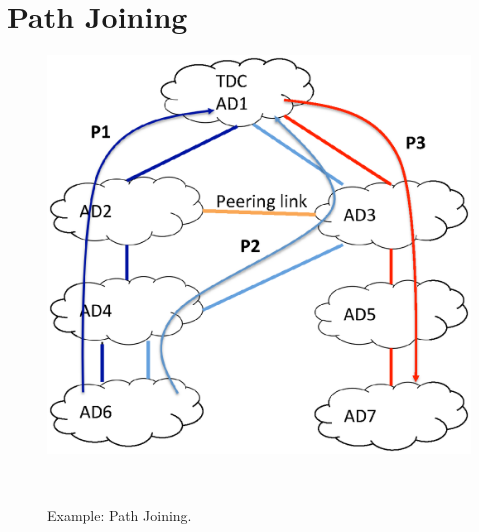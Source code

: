 \section{Path Joining}

\begin{figure}[ht]
\centering
\includegraphics[width=.7\columnwidth]{./fig/pathjoin.eps}
\caption{Example: Path Joining.}~\label{fig:pathjoin}
\end{figure}

